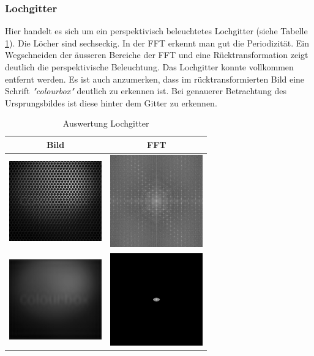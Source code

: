 \documentclass[12pt,german]{article}
\begin{document}
\subsubsection{Lochgitter}
Hier handelt es sich um ein perspektivisch beleuchtetes Lochgitter (siehe Tabelle \ref{tab:AuswertungLochgitter}). Die Löcher sind sechseckig. In der FFT erkennt man gut die Periodizität. Ein Wegschneiden der äusseren Bereiche der FFT und eine Rücktransformation zeigt deutlich die perspektivische Beleuchtung. Das Lochgitter konnte vollkommen entfernt werden. Es ist auch anzumerken, dass im rücktransformierten Bild eine Schrift \textit{"colourbox"} deutlich zu erkennen ist. Bei genauerer Betrachtung des Ursprungsbildes ist diese hinter dem Gitter zu erkennen.  
\begin{table}[H]
  \centering
  \begin{tabular}{c | c}
    \hline
    Bild & FFT \\
    \hline
	\includegraphics[width=4cm]{../testData/Lochgitter.jpg} & \includegraphics[width=4cm]{../testData/Results/Lochgitter/FFT_of_Lochgitter.jpg} \\
    \hline
    \includegraphics[width=4cm]{../testData/Results/Lochgitter/reducedLochgitter.jpg} & \includegraphics[width=4cm]{../testData/Results/Lochgitter/reducedFFT_of_Lochgitter.jpg} \\
  \end{tabular}
  \caption{Auswertung Lochgitter}
  \label{tab:AuswertungLochgitter}
\end{table}
\end{document}
